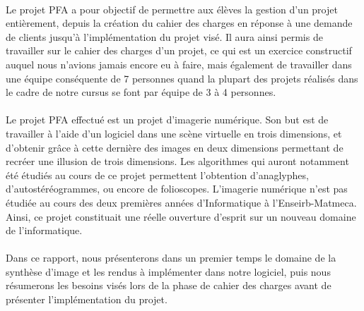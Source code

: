 \paragraph{}
        Le projet PFA a pour objectif de permettre aux élèves la gestion d'un projet entièrement, depuis la création du cahier des charges en réponse à une demande de clients jusqu'à l'implémentation du projet visé. Il aura ainsi permis de travailler sur le cahier des charges d'un projet, ce qui est un exercice constructif auquel nous n'avions jamais encore eu à faire, mais également de travailler dans une équipe conséquente de 7 personnes quand la plupart des projets réalisés dans le cadre de notre cursus se font par équipe de 3 à 4 personnes.

\paragraph{}      
        Le projet PFA effectué est un projet d'imagerie numérique. Son but est de travailler à l'aide d'un logiciel dans une scène virtuelle en trois dimensions, et d'obtenir grâce à cette dernière des images en deux dimensions permettant de recréer une illusion de trois dimensions. Les algorithmes qui auront notamment été étudiés au cours de ce projet permettent l'obtention d'anaglyphes, d'autostéréogrammes, ou encore de folioscopes.
        L'imagerie numérique n'est pas étudiée au cours des deux premières années d'Informatique à l'Enseirb-Matmeca. Ainsi, ce projet constituait une réelle ouverture d'esprit sur un nouveau domaine de l'informatique.
        
\paragraph{}
        Dans ce rapport, nous présenterons dans un premier temps le domaine de la synthèse d'image et les rendus à implémenter dans notre logiciel, puis nous résumerons les besoins visés lors de la phase de cahier des charges avant de présenter l'implémentation du projet.
